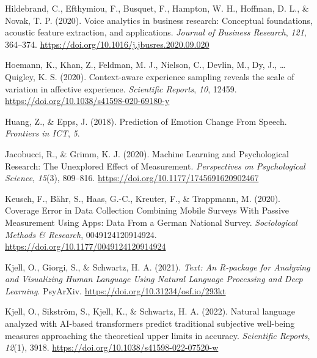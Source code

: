 \documentclass[
  english,
  man,floatsintext]{apa6}
\newlength{\cslhangindent}
\newenvironment{CSLReferences}[2] %
 {%
  \setlength{\parindent}{0pt}
  \ifodd #1 \everypar{\setlength{\hangindent}{\cslhangindent}}\ignorespaces\fi
  \ifnum #2 > 0
  \setlength{\parskip}{#2\baselineskip}
  \fi
 }%
 {}
\begin{document}
\begin{CSLReferences}{1}{0}
\leavevmode{}%
Hildebrand, C., Efthymiou, F., Busquet, F., Hampton, W. H., Hoffman, D. L., \& Novak, T. P. (2020). Voice analytics in business research: {Conceptual} foundations, acoustic feature extraction, and applications. \emph{Journal of Business Research}, \emph{121}, 364--374. \url{https://doi.org/10.1016/j.jbusres.2020.09.020}

\leavevmode{}%
Hoemann, K., Khan, Z., Feldman, M. J., Nielson, C., Devlin, M., Dy, J., \ldots{} Quigley, K. S. (2020). Context-aware experience sampling reveals the scale of variation in affective experience. \emph{Scientific Reports}, \emph{10}, 12459. \url{https://doi.org/10.1038/s41598-020-69180-y}

\leavevmode{}%
Huang, Z., \& Epps, J. (2018). Prediction of {Emotion Change From Speech}. \emph{Frontiers in ICT}, \emph{5}.

\leavevmode{}%
Jacobucci, R., \& Grimm, K. J. (2020). Machine {Learning} and {Psychological Research}: {The Unexplored Effect} of {Measurement}. \emph{Perspectives on Psychological Science}, \emph{15}(3), 809--816. \url{https://doi.org/10.1177/1745691620902467}

\leavevmode{}%
Keusch, F., Bähr, S., Haas, G.-C., Kreuter, F., \& Trappmann, M. (2020). Coverage {Error} in {Data Collection Combining Mobile Surveys With Passive Measurement Using Apps}: {Data From} a {German National Survey}. \emph{Sociological Methods \& Research}, 0049124120914924. \url{https://doi.org/10.1177/0049124120914924}

\leavevmode{}%
Kjell, O., Giorgi, S., \& Schwartz, H. A. (2021). \emph{Text: {An R-package} for {Analyzing} and {Visualizing Human Language Using Natural Language Processing} and {Deep Learning}}. PsyArXiv. \url{https://doi.org/10.31234/osf.io/293kt}

\leavevmode{}%
Kjell, O., Sikström, S., Kjell, K., \& Schwartz, H. A. (2022). Natural language analyzed with {AI-based} transformers predict traditional subjective well-being measures approaching the theoretical upper limits in accuracy. \emph{Scientific Reports}, \emph{12}(1), 3918. \url{https://doi.org/10.1038/s41598-022-07520-w}


\end{CSLReferences}
\end{document}
